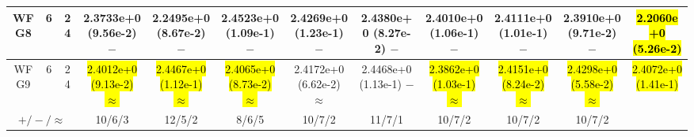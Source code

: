 \documentclass[journal]{IEEEtran}
\begin{document}
\begin{table*}[htbp]
\begin{tabular}{cccccccccccc}
\hline
\multirow{1}{*}{WFG8}&6&24&2.3733e+0 (9.56e-2) $-$&2.2495e+0 (8.67e-2) $-$&2.4523e+0 (1.09e-1) $-$&2.4269e+0 (1.23e-1) $-$&2.4380e+0 (8.27e-2) $-$&2.4010e+0 (1.06e-1) $-$&2.4111e+0 (1.01e-1) $-$&2.3910e+0 (9.71e-2) $-$&\hl{2.2060e+0 (5.26e-2)}\\
\hline
\multirow{1}{*}{WFG9}&6&24&\hl{2.4012e+0 (9.13e-2) $\approx$}&\hl{2.4467e+0 (1.12e-1) $\approx$}&\hl{2.4065e+0 (8.73e-2) $\approx$}&2.4172e+0 (6.62e-2) $\approx$&2.4468e+0 (1.13e-1) $-$&\hl{2.3862e+0 (1.03e-1) $\approx$}&\hl{2.4151e+0 (8.24e-2) $\approx$}&\hl{2.4298e+0 (5.58e-2) $\approx$}&\hl{2.4072e+0 (1.41e-1)}\\
\hline
\multicolumn{3}{c}{$+/-/\approx$}&10/6/3&12/5/2&8/6/5&10/7/2&11/7/1&10/7/2&10/7/2&10/7/2&\\
\bottomrule
\end{tabular}
\label{No Label}
\end{table*}
\end{document}
